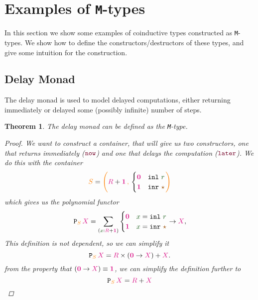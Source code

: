 \documentclass[twoside,11pt,openright]{report}
\theoremstyle{plain} %
\newtheorem{thm}{Theorem}[section]
\theoremstyle{definition}
\theoremstyle{remark}
\newcommand*{\term}[1]{\textcolor{green!30!black}{#1}} %
\newcommand*{\type}[1]{\textcolor{magenta!90!black}{#1}}
\newcommand*{\container}[1]{\textcolor{orange}{#1}}
\newcommand*{\containerpair}[2]{\ensuremath{\colorlet{savedleftcolor}{.}\color{orange}\left(\color{savedleftcolor}#1\,\textcolor{orange}{\mathbf{,}}\,#2\color{orange}\right)\color{savedleftcolor}}}
\newcommand*{\unit}{\type{\textbf{1}}}
\newcommand*{\empt}{\type{\textbf{0}}}
\newcommand*{\constant}[1]{\textcolor{orange!60!black}{\ensuremath{\mathtt{#1}}}}
\newcommand*{\constructor}[1]{\textcolor{purple!60!black}{\ensuremath{\mathtt{#1}}}}
\newcommand*{\functor}[1]{\ensuremath{\mathbf{\mathtt{#1}}}}
\newcommand*{\unitelem}{\constant{\star}} %
\begin{document}
\section{Examples of \texttt{M}-types}
\label{ch:M-types-examples}
In this section we show some examples of coinductive types constructed as \texttt{M}-types. We show how to define the constructors/destructors of these types, and give some intuition for the construction.

\subsection{Delay Monad}
The delay monad is used to model delayed computations, either returning immediately or delayed some (possibly infinite) number of steps.
\begin{thm}
  The delay monad can be defined as the \texttt{M}-type.
  \begin{proof}
    We want to construct a container, that will give us two constructors, one that returns immediately (\(\constructor{now}\)) and one that delays the computation (\(\constructor{later}\)). We do this with the container
    \begin{equation}
      \container{S} = \containerpair{\type{R} +\unit}{\begin{cases} \empt & \mathtt{inl}~\term{r} \\ \unit & \mathtt{inr}~\unitelem \end{cases}}
    \end{equation}
    which gives us the polynomial functor
    \begin{equation}
      \functor{P}_{\container{S}}\,\type{X} = \sum_{(\term{x} : \type{R} + \unit)} \begin{cases} \empt & \term{x} = \mathtt{inl}~\term{r} \\ \unit & \term{x} = \mathtt{inr}~\unitelem \end{cases} \rightarrow \type{X},
    \end{equation}
    This definition is not dependent, so we can simplify it 
    \begin{equation}
      \functor{P}_{\container{S}}\,\type{X} = \type{R} \times (\empt \rightarrow \type{X}) + \type{X}.
    \end{equation}
    from the property that \((\empt \rightarrow \type{X}) \equiv \unit\), we can simplify the definition further to
    \begin{equation}
      \functor{P}_{\container{S}}\,\type{X} = \type{R} + \type{X}
    \end{equation}

\end{proof}
\end{thm}
\end{document}
